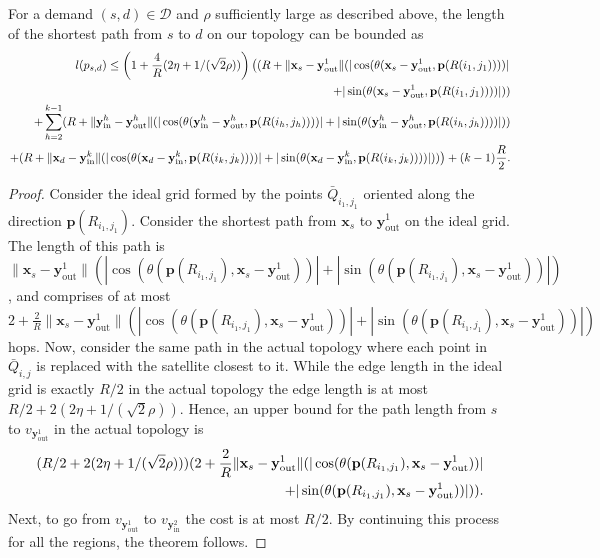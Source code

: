 \documentclass[acmsmall, screen]{acmart}
\begin{document}
\begin{theorem}
\label{thm:upper bound}
For a demand $(s,d) \in \mathcal{D}$ and $\rho $ sufficiently large as described above, the length of the shortest path from $s$ to $d$ on our topology can be bounded as 
\begin{align}
l(p_{s,d}) \leq \left(1 + \frac{4}{R}(2\eta + 1/(\sqrt{2}\rho)) \right) \left( (R + \| \mathbf{x}_s - \mathbf{y}^1_\mathrm{out} \|(|\cos(\theta(\mathbf{x}_s - \mathbf{y}^1_\mathrm{out}, \mathbf{p}(R(i_1, j_1))))| \right. \notag \\
 + |\sin(\theta(\mathbf{x}_s - \mathbf{y}^1_\mathrm{out}, \mathbf{p}(R(i_1, j_1))))| ) ) \notag \\
+ \sum_{h=2}^{k-1} (R + \| \mathbf{y}^h_\mathrm{in} - \mathbf{y}^h_\mathrm{out} \|(|\cos(\theta(\mathbf{y}^h_\mathrm{in} - \mathbf{y}^h_\mathrm{out}, \mathbf{p}(R(i_h, j_h))))| + |\sin(\theta(\mathbf{y}^h_\mathrm{in} - \mathbf{y}^h_\mathrm{out}, \mathbf{p}(R(i_h, j_h))))| ) )\notag \\
\left. + (R + \| \mathbf{x}_d - \mathbf{y}^k_\mathrm{in} \|(|\cos(\theta(\mathbf{x}_d - \mathbf{y}^k_\mathrm{in}, \mathbf{p}(R(i_k, j_k))))| + |\sin(\theta(\mathbf{x}_d - \mathbf{y}^k_\mathrm{in}, \mathbf{p}(R(i_k, j_k))))| ) ) \right) + (k-1)\frac{R}{2}.  
\end{align} 
\end{theorem}
\begin{proof}
Consider the ideal grid formed by the points $\bar{Q}_{i_1,j_1}$ oriented along the direction $\mathbf{p}(R_{i_1,j_1})$.  
Consider the shortest path from $\mathbf{x}_s$ to $\mathbf{y}^1_\mathrm{out}$ on the ideal grid. 
The length of this path is $\| \mathbf{x}_s - \mathbf{y}^1_\mathrm{out} \| ( | \cos(\theta(\mathbf{p}(R_{i_1,j_1}), \mathbf{x}_s - \mathbf{y}^1_\mathrm{out})) | + | \sin(\theta(\mathbf{p}(R_{i_1,j_1}), \mathbf{x}_s - \mathbf{y}^1_\mathrm{out}))| )$, and comprises of at most $2 + \frac{2}{R} \| \mathbf{x}_s - \mathbf{y}^1_\mathrm{out} \| ( | \cos(\theta(\mathbf{p}(R_{i_1,j_1}), \mathbf{x}_s - \mathbf{y}^1_\mathrm{out})) | + | \sin(\theta(\mathbf{p}(R_{i_1,j_1}), \mathbf{x}_s - \mathbf{y}^1_\mathrm{out}))| )$ hops. 
Now, consider the same path in the actual topology where each point in $\bar{Q}_{i,j}$ is replaced with the satellite closest to it. 
While the edge length in the ideal grid is exactly $R/2$ in the actual topology the edge length is at most $R/2 + 2(2\eta + 1/(\sqrt{2}\rho))$. 
Hence, an upper bound for the path length from $s$ to $v_{\mathbf{y}^1_\mathrm{out}}$ in the actual topology is 
\begin{align}
(R/2 + 2(2\eta + 1/(\sqrt{2}\rho)))( 2 + \frac{2}{R} \| \mathbf{x}_s - \mathbf{y}^1_\mathrm{out} \| ( | \cos(\theta(\mathbf{p}(R_{i_1,j_1}), \mathbf{x}_s - \mathbf{y}^1_\mathrm{out})) | \notag \\
+ | \sin(\theta(\mathbf{p}(R_{i_1,j_1}), \mathbf{x}_s - \mathbf{y}^1_\mathrm{out}))| ) ). 
\end{align}
Next, to go from $v_{\mathbf{y}^1_\mathrm{out}}$ to $v_{\mathbf{y}^2_\mathrm{in}}$ the cost is at most $R/2$. 
By continuing this process for all the regions, the theorem follows.
\end{proof}
\end{document}
